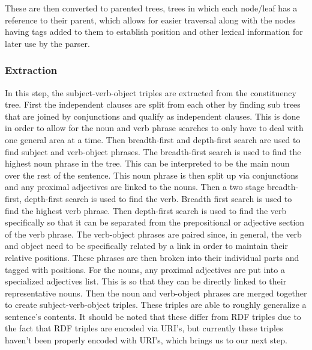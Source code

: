 \documentclass[12pt]{article}
\begin{document}
	These are then converted to parented trees, trees in which each node/leaf has a reference to their parent, which allows for easier traversal along with the nodes having tags added to them to establish position and other lexical information for later use by the parser.
	
	\subsubsection{Extraction} 
	\quad In this step, the subject-verb-object triples are extracted from the constituency tree. First the independent clauses are split from each other by finding sub trees that are joined by conjunctions and qualify as independent clauses. This is done in order to allow for the noun and verb phrase searches to only have to deal with one general area at a time. Then breadth-first and depth-first search are used to find subject and verb-object phrases. The breadth-first search is used to find the highest noun phrase in the tree. This can be interpreted to be the main noun over the rest of the sentence. This noun phrase is then split up via conjunctions and any proximal adjectives are linked to the nouns. Then a two stage breadth-first, depth-first search is used to find the verb.
	Breadth first search is used to find the highest verb phrase. Then depth-first search is used to find the verb specifically so that it can be separated from the prepositional or adjective section of the verb phrase. The verb-object phrases are paired since, in general, the verb and object need to be specifically related by a link in order to maintain their relative positions. These phrases are then broken into their individual parts and tagged with positions. For the nouns, any proximal adjectives are put into a specialized adjectives list. This is so that they can be directly linked to their representative nouns. Then the noun and verb-object phrases are merged together to create subject-verb-object triples. These triples are able to roughly generalize a sentence’s contents. It should be noted that these differ from RDF triples due to the fact that RDF triples are encoded via URI’s, but currently these triples haven’t been properly encoded with URI’s, which brings us to our next step. 
\end{document}
